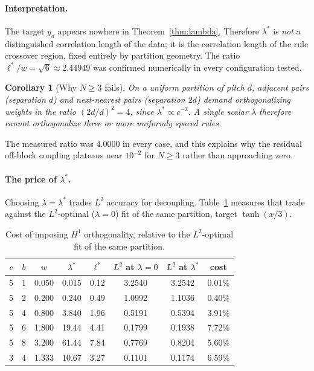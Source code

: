\documentclass[11pt]{article}
\theoremstyle{plain}
\newtheorem{corollary}[theorem]{Corollary}
\theoremstyle{definition}
\begin{document}
\paragraph{Interpretation.} The target $y_d$ appears nowhere in
Theorem~\ref{thm:lambda}. Therefore $\lambda^{*}$ is \emph{not} a distinguished
correlation length of the data; it is the correlation length of the rule
crossover region, fixed entirely by partition geometry. The ratio
$\ell^{*}/w=\sqrt{6}\approx2.44949$ was confirmed numerically in every
configuration tested.

\begin{corollary}[Why $N\ge3$ fails]
\label{cor:three}
On a uniform partition of pitch $d$, adjacent pairs (separation $d$) and
next-nearest pairs (separation $2d$) demand orthogonalizing weights in the
ratio $(2d/d)^{2}=4$, since $\lambda^{*}\propto c^{-2}$. A single scalar
$\lambda$ therefore cannot orthogonalize three or more uniformly spaced rules.
\end{corollary}

The measured ratio was $4.0000$ in every case, and this explains why the
residual off-block coupling plateaus near $10^{-2}$ for $N\ge3$ rather than
approaching zero.

\paragraph{The price of $\lambda^{*}$.} Choosing $\lambda=\lambda^{*}$ trades
$L^2$ accuracy for decoupling. Table~\ref{tab:price} measures that trade
against the $L^2$-optimal ($\lambda=0$) fit of the same partition, target
$\tanh(x/3)$.

\begin{table}[t]
\centering
\caption{Cost of imposing $H^1$ orthogonality, relative to the $L^2$-optimal
fit of the same partition.}
\label{tab:price}
\begin{tabular}{cccccccc}
\toprule
$c$ & $b$ & $w$ & $\lambda^{*}$ & $\ell^{*}$ &
$L^2$ at $\lambda{=}0$ & $L^2$ at $\lambda^{*}$ & cost \\
\midrule
5 & 1 & 0.050 & 0.015 & 0.12 & 3.2540 & 3.2542 & 0.01\% \\
5 & 2 & 0.200 & 0.240 & 0.49 & 1.0992 & 1.1036 & 0.40\% \\
5 & 4 & 0.800 & 3.840 & 1.96 & 0.5191 & 0.5394 & 3.91\% \\
5 & 6 & 1.800 & 19.44 & 4.41 & 0.1799 & 0.1938 & 7.72\% \\
5 & 8 & 3.200 & 61.44 & 7.84 & 0.7769 & 0.8204 & 5.60\% \\
3 & 4 & 1.333 & 10.67 & 3.27 & 0.1101 & 0.1174 & 6.59\% \\
\bottomrule
\end{tabular}
\end{table}
\end{document}
